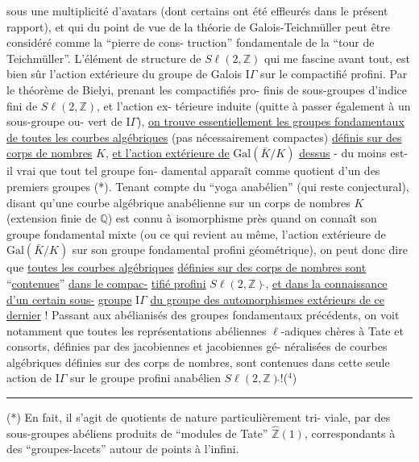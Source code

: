 
sous une multiplicité d'avatars (dont certains ont été effleurés
dans le présent rapport), et qui du point de vue de la théorie de
Galois-Teichmüller peut être considéré comme la ``pierre de cons-%
truction'' fondamentale de la ``tour de Teichmüller''. L'élément de
structure de $S\ell(2,\mathbb{Z})$ qui me fascine avant tout, est bien sûr
l'action extérieure du groupe de Galois $\mathrm{I}\!\Gamma$ sur le compactifié
profini. Par le théorème de Bielyi, prenant les compactifiés pro-%
finis de sous-groupes d'indice fini de $S\ell(2,\mathbb{Z})$, et l'action ex-%
térieure induite (quitte à passer également à un sous-groupe ou-%
vert de $\mathrm{I}\!\Gamma$), \uline{on trouve essentiellement les groupes fondamentaux}
\uline{de toutes les courbes algébriques} (pas nécessairement compactes)
\uline{définis sur des corps de nombres} $K$, \uline{et l'action extérieure de}
$\mathrm{Gal}(\bar{K}/K)$ \uline{dessus} - du moins est-il vrai que tout tel groupe fon-%
damental apparaît comme quotient d'un des premiers groupes (*).
Tenant compte du ``yoga anabélien'' (qui reste conjectural), disant
qu'une courbe algébrique anabélienne sur un corps de nombres $K$
(extension finie de $\mathbb{Q}$) est connu à isomorphisme près quand on
connaît son groupe fondamental mixte (ou ce qui revient au même,
l'action extérieure de $\mathrm{Gal}(\bar{K}/K)$ sur son groupe fondamental profini
géométrique), on peut donc dire que \uline{toutes les courbes algébriques}
\uline{définies sur des corps de nombres sont} ``\uline{contenues}'' \uline{dans le compac-}%
\uline{tifié profini} $S\ell(2,\mathbb{Z})\hat{}$, \uline{et dans la connaissance d'un certain sous-}%
\uline{groupe} $\mathrm{I}\!\Gamma$ \uline{du groupe des automorphismes extérieurs de ce dernier} !
Passant aux abélianisés des groupes fondamentaux précédents, on voit
notamment que toutes les représentations abéliennes $\ell$-adiques chères
à Tate et consorts, définies par des jacobiennes et jacobiennes gé-%
néralisées de courbes algébriques définies sur des corps de nombres,
sont contenues dans cette seule action de $\mathrm{I}\!\Gamma$ sur le groupe profini
anabélien $S\ell(2,\mathbb{Z})\hat{}$!($^{4}$)

\rule{5cm}{0.4pt}

(*) En fait, il s'agit de quotients de nature particulièrement tri-%
viale, par des sous-groupes abéliens produits de ``modules de Tate''
$\hat{\mathbb{Z}}(1)$, correspondants à des ``groupes-lacets'' autour de points à l'infini.

